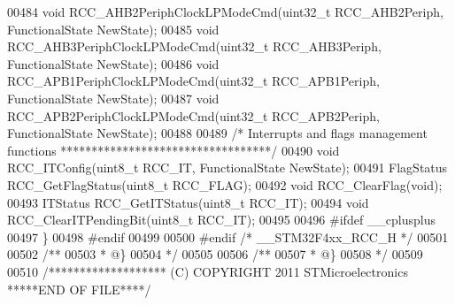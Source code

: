 \begin{DoxyCode}
00484 \textcolor{keywordtype}{void} RCC_AHB2PeriphClockLPModeCmd(uint32\_t RCC\_AHB2Periph, FunctionalState NewState);
00485 \textcolor{keywordtype}{void} RCC_AHB3PeriphClockLPModeCmd(uint32\_t RCC\_AHB3Periph, FunctionalState NewState);
00486 \textcolor{keywordtype}{void} RCC_APB1PeriphClockLPModeCmd(uint32\_t RCC\_APB1Periph, FunctionalState NewState);
00487 \textcolor{keywordtype}{void} RCC_APB2PeriphClockLPModeCmd(uint32\_t RCC\_APB2Periph, FunctionalState NewState);
00488 
00489 \textcolor{comment}{/* Interrupts and flags management functions **********************************/}
00490 \textcolor{keywordtype}{void} RCC_ITConfig(uint8\_t RCC\_IT, FunctionalState NewState);
00491 FlagStatus RCC_GetFlagStatus(uint8\_t RCC\_FLAG);
00492 \textcolor{keywordtype}{void} RCC_ClearFlag(\textcolor{keywordtype}{void});
00493 ITStatus RCC_GetITStatus(uint8\_t RCC\_IT);
00494 \textcolor{keywordtype}{void} RCC_ClearITPendingBit(uint8\_t RCC\_IT);
00495 
00496 \textcolor{preprocessor}{#}\textcolor{preprocessor}{ifdef} \_\_cplusplus
00497 \}
00498 \textcolor{preprocessor}{#}\textcolor{preprocessor}{endif}
00499 
00500 \textcolor{preprocessor}{#}\textcolor{preprocessor}{endif} \textcolor{comment}{/* \_\_STM32F4xx\_RCC\_H */}
00501 
00502 \textcolor{comment}{/**}
00503 \textcolor{comment}{  * @\}}
00504 \textcolor{comment}{  */}
00505 
00506 \textcolor{comment}{/**}
00507 \textcolor{comment}{  * @\}}
00508 \textcolor{comment}{  */}
00509 
00510 \textcolor{comment}{/******************* (C) COPYRIGHT 2011 STMicroelectronics *****END OF FILE****/}
\end{DoxyCode}
